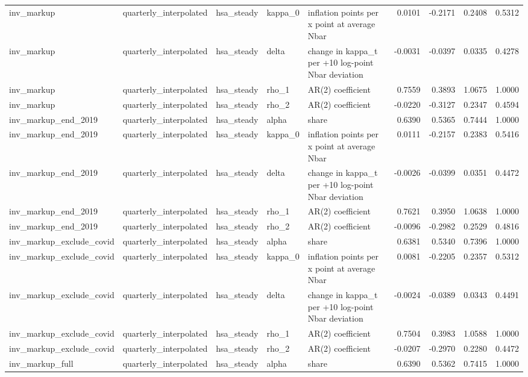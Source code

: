 \begin{tabular}{lllllrrrr}
inv\_markup & quarterly\_interpolated & hsa\_steady & kappa\_0 & inflation points per x point at average Nbar & 0.0101 & -0.2171 & 0.2408 & 0.5312 \\
inv\_markup & quarterly\_interpolated & hsa\_steady & delta & change in kappa\_t per +10 log-point Nbar deviation & -0.0031 & -0.0397 & 0.0335 & 0.4278 \\
inv\_markup & quarterly\_interpolated & hsa\_steady & rho\_1 & AR(2) coefficient & 0.7559 & 0.3893 & 1.0675 & 1.0000 \\
inv\_markup & quarterly\_interpolated & hsa\_steady & rho\_2 & AR(2) coefficient & -0.0220 & -0.3127 & 0.2347 & 0.4594 \\
inv\_markup\_end\_2019 & quarterly\_interpolated & hsa\_steady & alpha & share & 0.6390 & 0.5365 & 0.7444 & 1.0000 \\
inv\_markup\_end\_2019 & quarterly\_interpolated & hsa\_steady & kappa\_0 & inflation points per x point at average Nbar & 0.0111 & -0.2157 & 0.2383 & 0.5416 \\
inv\_markup\_end\_2019 & quarterly\_interpolated & hsa\_steady & delta & change in kappa\_t per +10 log-point Nbar deviation & -0.0026 & -0.0399 & 0.0351 & 0.4472 \\
inv\_markup\_end\_2019 & quarterly\_interpolated & hsa\_steady & rho\_1 & AR(2) coefficient & 0.7621 & 0.3950 & 1.0638 & 1.0000 \\
inv\_markup\_end\_2019 & quarterly\_interpolated & hsa\_steady & rho\_2 & AR(2) coefficient & -0.0096 & -0.2982 & 0.2529 & 0.4816 \\
inv\_markup\_exclude\_covid & quarterly\_interpolated & hsa\_steady & alpha & share & 0.6381 & 0.5340 & 0.7396 & 1.0000 \\
inv\_markup\_exclude\_covid & quarterly\_interpolated & hsa\_steady & kappa\_0 & inflation points per x point at average Nbar & 0.0081 & -0.2205 & 0.2357 & 0.5312 \\
inv\_markup\_exclude\_covid & quarterly\_interpolated & hsa\_steady & delta & change in kappa\_t per +10 log-point Nbar deviation & -0.0024 & -0.0389 & 0.0343 & 0.4491 \\
inv\_markup\_exclude\_covid & quarterly\_interpolated & hsa\_steady & rho\_1 & AR(2) coefficient & 0.7504 & 0.3983 & 1.0588 & 1.0000 \\
inv\_markup\_exclude\_covid & quarterly\_interpolated & hsa\_steady & rho\_2 & AR(2) coefficient & -0.0207 & -0.2970 & 0.2280 & 0.4472 \\
inv\_markup\_full & quarterly\_interpolated & hsa\_steady & alpha & share & 0.6390 & 0.5362 & 0.7415 & 1.0000 \\

\end{tabular}
